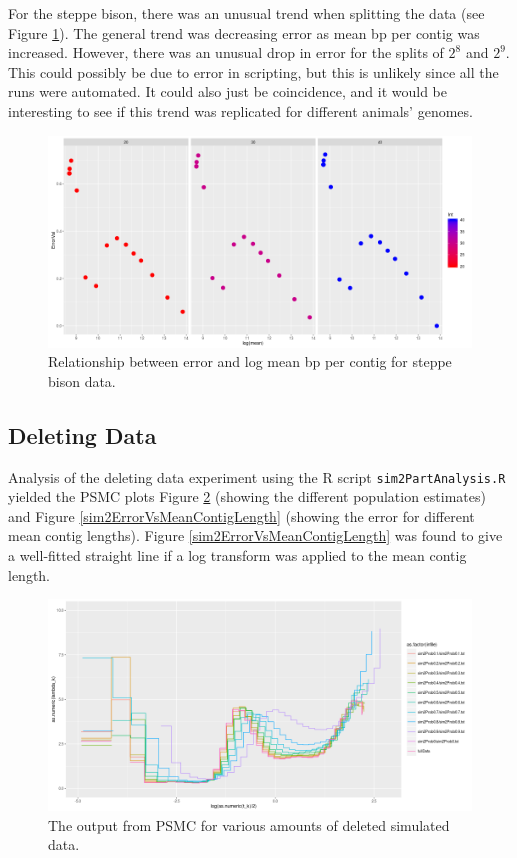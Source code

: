 \documentclass[11pt,a4paper]{article}
\begin{document}
For the steppe bison, there was an unusual trend when splitting the data (see Figure \ref{steppeBisonWeirdTrend}). The general trend was decreasing error as mean bp per contig was increased. However, there was an unusual drop in error for the splits of $2^8$ and $2^9$. This could possibly be due to error in scripting, but this is unlikely since all the runs were automated. It could also just be coincidence, and it would be interesting to see if this trend was replicated for different animals' genomes.

\begin{figure}[h]
  \center
  \includegraphics[width=.7\linewidth]{figures/steppeBisonWeirdTrend.png}
  \caption{Relationship between error and log mean bp per contig for steppe bison data.}\label{steppeBisonWeirdTrend}
\end{figure}

\subsection{Deleting Data}
Analysis of the deleting data experiment using the R script \verb|sim2PartAnalysis.R| yielded the PSMC plots Figure \ref{deletedDataPsmcPlots} (showing the different population estimates) and Figure \ref{sim2ErrorVsMeanContigLength} (showing the error for different mean contig lengths). Figure \ref{sim2ErrorVsMeanContigLength} was found to give a well-fitted straight line if a log transform was applied to the mean contig length.

\begin{figure}[h]
  \center
  \includegraphics[width=1\linewidth]{figures/deletedDataPsmcPlots.png}
  \caption{The output from PSMC for various amounts of deleted simulated data.}\label{deletedDataPsmcPlots}
\end{figure}
\end{document}
